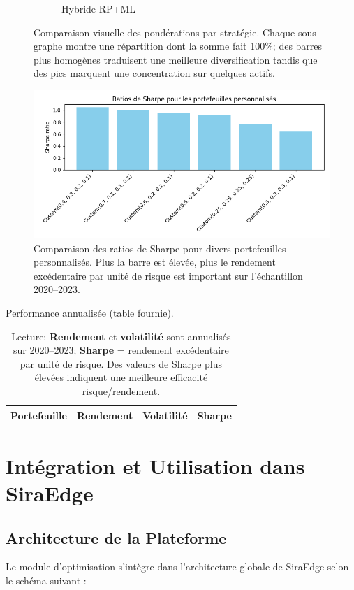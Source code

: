 \documentclass[11pt,a4paper]{article}
\begin{document}
\begin{figure}[h]
\begin{subfigure}[b]{0.48\textwidth}
    \caption{Hybride RP+ML}
  \end{subfigure}
  \caption{Comparaison visuelle des pondérations par stratégie. Chaque sous-graphe montre une répartition dont la somme fait 100\%; des barres plus homogènes traduisent une meilleure diversification tandis que des pics marquent une concentration sur quelques actifs.}
  \label{fig:weights_external}
\end{figure}

\begin{figure}[h]
  \centering
  \includegraphics[width=0.9\linewidth]{../../figures/custom_portfolios_sharpe.png}
  \caption{Comparaison des ratios de Sharpe pour divers portefeuilles personnalisés. Plus la barre est élevée, plus le rendement excédentaire par unité de risque est important sur l'échantillon 2020--2023.}
  \label{fig:custom_sharpe_external}
\end{figure}

\begin{table}[h]
  \centering
  \caption{Performance annualisée (table fournie).}
  \label{tab:summary_external}
  \begin{tabular}{lccc}
    \hline
    Portefeuille & Rendement & Volatilité & Sharpe \\
    \hline
    
  \end{tabular}
  \caption*{\footnotesize Lecture: \textbf{Rendement} et \textbf{volatilité} sont annualisés sur 2020--2023; \textbf{Sharpe} = rendement excédentaire par unité de risque. Des valeurs de Sharpe plus élevées indiquent une meilleure efficacité risque/rendement.}
\end{table}

\section{Intégration et Utilisation dans SiraEdge}

\subsection{Architecture de la Plateforme}
Le module d'optimisation s'intègre dans l'architecture globale de SiraEdge selon le schéma suivant :
\end{document}

